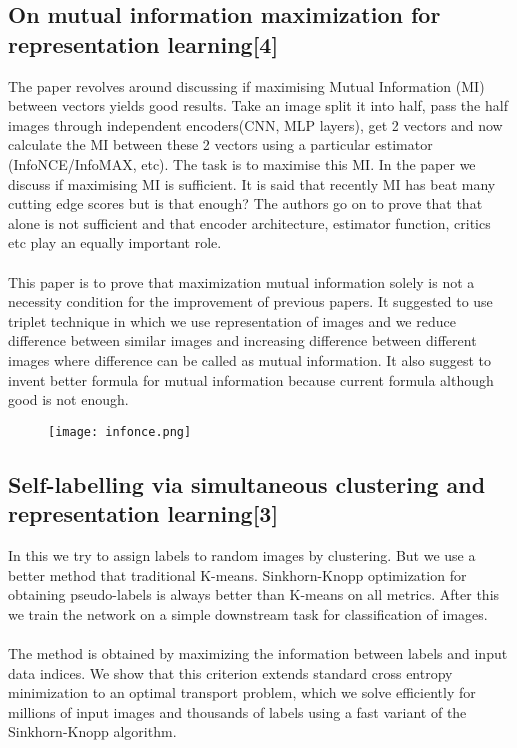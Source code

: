 \documentclass[a4paper, 12pt]{article}
\begin{document}
\subsection{On mutual information maximization for  representation learning[4]}
\hspace{1cm}  
The paper revolves around discussing if maximising Mutual Information (MI) between vectors yields good results. Take an image split it into half, pass the half images through independent encoders(CNN, MLP layers), get 2 vectors and now calculate the MI between these 2 vectors using a particular estimator (InfoNCE/InfoMAX, etc). The task is to maximise this MI. In the paper we discuss if maximising MI is sufficient. It is said that recently MI has beat many cutting edge scores but is that enough? The authors go on to prove that that alone is not sufficient and that encoder architecture, estimator function, critics etc play an equally important role.\\
\\
This paper is to prove that maximization mutual information solely is not a necessity condition for the improvement of previous papers. It suggested to use triplet technique in which we use representation of images and we reduce difference between similar images and increasing difference between different images where difference can be called as mutual information. It also suggest to invent better formula for mutual information because current formula although good is not enough.
\begin{figure}[htp]
    \centering
    \texttt{[image: infonce.png]}

\end{figure}

\subsection{Self-labelling via simultaneous clustering and representation learning[3] }
\hspace{1cm} 
In this we try to assign labels to random images by clustering. But we use a better method that traditional K-means. Sinkhorn-Knopp optimization for obtaining pseudo-labels is always better than K-means on all metrics. After this we train the network on a simple downstream task for classification of images.\\
\\
The method is obtained by maximizing the information between
labels and input data indices. We show that this criterion extends standard cross entropy minimization to an optimal transport problem, which we solve efficiently
for millions of input images and thousands of labels using a fast variant of the
Sinkhorn-Knopp algorithm. 
\end{document}
